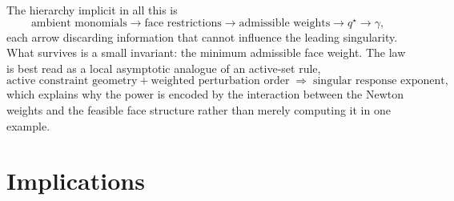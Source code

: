 \documentclass[11pt]{article}
\theoremstyle{definition}
\theoremstyle{remark}
\begin{document}
The hierarchy implicit in all this is
\[
  \text{ambient monomials}\longrightarrow\text{face restrictions}
  \longrightarrow\text{admissible weights}\longrightarrow q^\star
  \longrightarrow\gamma,
\]
each arrow discarding information that cannot influence the leading
singularity. What survives is a small invariant: the minimum admissible face
weight. The law is best read as a local asymptotic analogue of an active-set
rule,
\[
  \text{active constraint geometry}+\text{weighted perturbation order}
  \;\Longrightarrow\;\text{singular response exponent},
\]
which explains why the power is encoded by the interaction between the Newton
weights and the feasible face structure rather than merely computing it in one
example.

\section{Implications}
\end{document}
